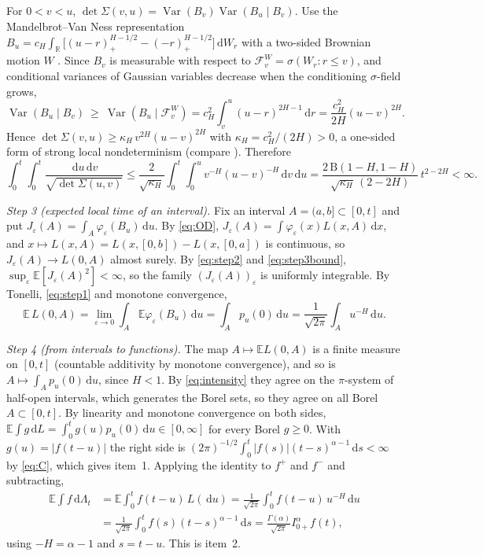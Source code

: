 \documentclass[11pt]{article}
\theoremstyle{remark}
\theoremstyle{definition}
\newcommand{\E}{\mathbb{E}}
\newcommand{\R}{\mathbb{R}}
\newcommand{\dd}{\,\mathrm{d}}
\newcommand{\Ia}{I^{\alpha}_{0+}}
\begin{document}
For $0<v<u$, $\det\Sigma(v,u)=\operatorname{Var}(B_v)\operatorname{Var}(B_u\mid B_v)$. Use the Mandelbrot--Van Ness representation $B_u=c_H\int_\R\big[(u-r)_+^{H-1/2}-(-r)_+^{H-1/2}\big]\dd W_r$ with a two-sided Brownian motion $W$ \cite{MvN68}. Since $B_v$ is measurable with respect to $\mathcal F^W_v=\sigma(W_r:r\le v)$, and conditional variances of Gaussian variables decrease when the conditioning $\sigma$-field grows,
\[
\operatorname{Var}(B_u\mid B_v)\ \ge\ \operatorname{Var}(B_u\mid\mathcal F^W_v)=c_H^2\int_v^u(u-r)^{2H-1}\dd r=\frac{c_H^2}{2H}(u-v)^{2H}.
\]
Hence $\det\Sigma(v,u)\ge\kappa_H\,v^{2H}(u-v)^{2H}$ with $\kappa_H=c_H^2/(2H)>0$, a one-sided form of strong local nondeterminism (compare \cite{Pit78,Xia97}). Therefore
\begin{equation}\label{eq:step3bound}
\int_0^t\!\!\int_0^t\frac{\dd u\dd v}{\sqrt{\det\Sigma(u,v)}}\le\frac{2}{\sqrt{\kappa_H}}\int_0^t\!\!\int_0^u v^{-H}(u-v)^{-H}\dd v\dd u=\frac{2\,\mathrm B(1-H,1-H)}{\sqrt{\kappa_H}\,(2-2H)}\,t^{2-2H}<\infty .
\end{equation}

\emph{Step 3 (expected local time of an interval).} Fix an interval $A=(a,b]\subset[0,t]$ and put $J_\varepsilon(A)=\int_A\varphi_\varepsilon(B_u)\dd u$. By \eqref{eq:OD}, $J_\varepsilon(A)=\int\varphi_\varepsilon(x)L(x,A)\dd x$, and $x\mapsto L(x,A)=L(x,[0,b])-L(x,[0,a])$ is continuous, so $J_\varepsilon(A)\to L(0,A)$ almost surely. By \eqref{eq:step2} and \eqref{eq:step3bound}, $\sup_\varepsilon\E[J_\varepsilon(A)^2]<\infty$, so the family $(J_\varepsilon(A))_\varepsilon$ is uniformly integrable. By Tonelli, \eqref{eq:step1} and monotone convergence,
\begin{equation}\label{eq:intensity}
\E\,L(0,A)=\lim_{\varepsilon\to0}\int_A\E\varphi_\varepsilon(B_u)\dd u=\int_A p_u(0)\dd u=\frac1{\sqrt{2\pi}}\int_A u^{-H}\dd u .
\end{equation}

\emph{Step 4 (from intervals to functions).} The map $A\mapsto\E L(0,A)$ is a finite measure on $[0,t]$ (countable additivity by monotone convergence), and so is $A\mapsto\int_A p_u(0)\dd u$, since $H<1$. By \eqref{eq:intensity} they agree on the $\pi$-system of half-open intervals, which generates the Borel sets, so they agree on all Borel $A\subset[0,t]$. By linearity and monotone convergence on both sides, $\E\int g\dd L=\int_0^t g(u)p_u(0)\dd u\in[0,\infty]$ for every Borel $g\ge0$. With $g(u)=|f(t-u)|$ the right side is $(2\pi)^{-1/2}\int_0^t|f(s)|(t-s)^{\alpha-1}\dd s<\infty$ by \eqref{eq:C}, which gives item~1. Applying the identity to $f^+$ and $f^-$ and subtracting,
\begin{align*}
\E\int f\dd\Lambda_t&=\E\int_0^t f(t-u)\,L(\dd u)=\frac{1}{\sqrt{2\pi}}\int_0^t f(t-u)\,u^{-H}\dd u\\
&=\frac{1}{\sqrt{2\pi}}\int_0^t f(s)(t-s)^{\alpha-1}\dd s=\frac{\Gamma(\alpha)}{\sqrt{2\pi}}\Ia f(t),
\end{align*}
using $-H=\alpha-1$ and $s=t-u$. This is item~2.
\end{document}
